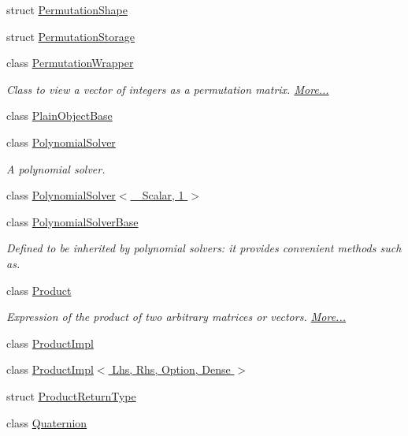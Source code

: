 \begin{DoxyCompactItemize}
struct \hyperlink{struct_eigen_1_1_permutation_shape}{Permutation\+Shape}
\item 
struct \hyperlink{struct_eigen_1_1_permutation_storage}{Permutation\+Storage}
\item 
class \hyperlink{group___core___module_class_eigen_1_1_permutation_wrapper}{Permutation\+Wrapper}
\begin{DoxyCompactList}\small\item\em Class to view a vector of integers as a permutation matrix.  \hyperlink{group___core___module_class_eigen_1_1_permutation_wrapper}{More...}\end{DoxyCompactList}\item 
class \hyperlink{class_eigen_1_1_plain_object_base}{Plain\+Object\+Base}
\item 
class \hyperlink{class_eigen_1_1_polynomial_solver}{Polynomial\+Solver}
\begin{DoxyCompactList}\small\item\em A polynomial solver. \end{DoxyCompactList}\item 
class \hyperlink{class_eigen_1_1_polynomial_solver_3_01___scalar_00_011_01_4}{Polynomial\+Solver$<$ \+\_\+\+Scalar, 1 $>$}
\item 
class \hyperlink{class_eigen_1_1_polynomial_solver_base}{Polynomial\+Solver\+Base}
\begin{DoxyCompactList}\small\item\em Defined to be inherited by polynomial solvers\+: it provides convenient methods such as. \end{DoxyCompactList}\item 
class \hyperlink{group___core___module_class_eigen_1_1_product}{Product}
\begin{DoxyCompactList}\small\item\em Expression of the product of two arbitrary matrices or vectors.  \hyperlink{group___core___module_class_eigen_1_1_product}{More...}\end{DoxyCompactList}\item 
class \hyperlink{class_eigen_1_1_product_impl}{Product\+Impl}
\item 
class \hyperlink{class_eigen_1_1_product_impl_3_01_lhs_00_01_rhs_00_01_option_00_01_dense_01_4}{Product\+Impl$<$ Lhs, Rhs, Option, Dense $>$}
\item 
struct \hyperlink{struct_eigen_1_1_product_return_type}{Product\+Return\+Type}
\item 
class \hyperlink{group___geometry___module_class_eigen_1_1_quaternion}{Quaternion}

\end{DoxyCompactItemize}
